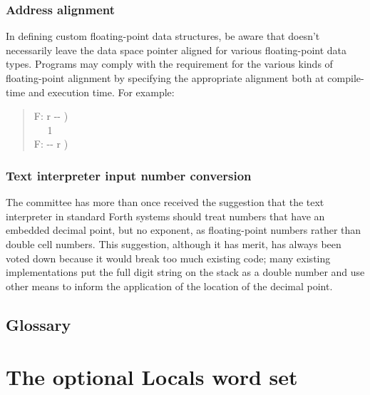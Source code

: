 \setcounter{subsubsection}{4}
\subsubsection{Address alignment} %

In defining custom floating-point data structures, be aware that
 doesn't necessarily leave the data space pointer
aligned for various floating-point data types. Programs may comply
with the requirement for the various kinds of floating-point alignment
by specifying the appropriate alignment both at compile-time and
execution time. For example:

\begin{quote}\ttfamily
	\word{:}   F: r -{}- ) \\
	\tab {}  ~~
		1   ~ \\
	\tab {}  F: -{}- r )
		~  \word{;}
\end{quote}

\setcounter{subsubsection}{6}
\subsubsection{Text interpreter input number conversion} %

The committee has more than once received the suggestion that the
text interpreter in standard Forth systems should treat numbers
that have an embedded decimal point, but no exponent, as
floating-point numbers rather than double cell numbers. This
suggestion, although it has merit, has always been voted down because
it would break too much existing code; many existing implementations
put the full digit string on the stack as a double number and use
other means to inform the application of the location of the decimal
point.

\setcounter{subsection}{5}
\subsection{Glossary} %



\section{The optional Locals word set} %
\label{rat:local}

